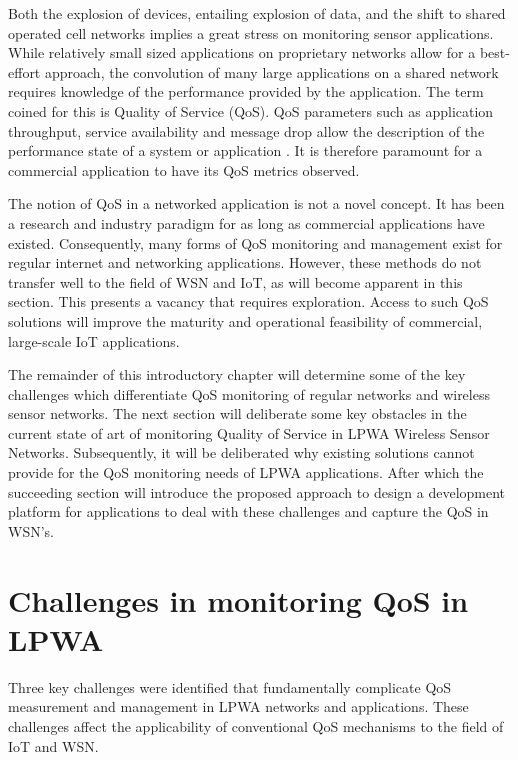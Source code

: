 Both the explosion of devices, entailing explosion of data, and the shift to shared operated cell networks implies a great stress on monitoring sensor applications. While relatively small sized applications on proprietary networks allow for a best-effort approach, the convolution of many large applications on a shared network requires knowledge of the performance provided by the application. The term coined for this is Quality of Service (QoS). QoS parameters such as application throughput, service availability and message drop allow the description of the performance state of a system or application \cite{qos_definition}. It is therefore paramount for a commercial application to have its QoS metrics observed.

The notion of QoS in a networked application is not a novel concept. It has been a research and industry paradigm for as long as commercial applications have existed. Consequently, many forms of QoS monitoring and management exist for regular internet and networking applications. However, these methods do not transfer well to the field of WSN and IoT, as will become apparent in this section. This presents a vacancy that requires exploration. Access to such QoS solutions will improve the maturity and operational feasibility of commercial, large-scale IoT applications.

The remainder of this introductory chapter will determine some of the key challenges which differentiate QoS monitoring of regular networks and wireless sensor networks. The next section will deliberate some key obstacles in the current state of art of monitoring Quality of Service in LPWA Wireless Sensor Networks. Subsequently, it will be deliberated why existing solutions cannot provide for the QoS monitoring  needs of LPWA applications. After which the succeeding section will introduce the proposed approach to design a development platform for applications to deal with these challenges and capture the QoS in WSN's.


\section{Challenges in monitoring QoS in LPWA}
\label{sec:challenges}
Three key challenges were identified that fundamentally complicate QoS measurement and management in LPWA networks and applications. These challenges affect the applicability of conventional QoS mechanisms to the field of IoT and WSN. %

